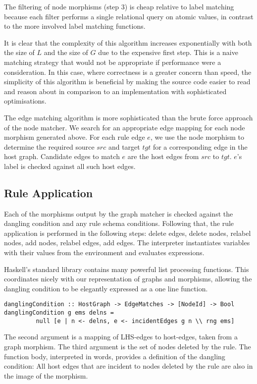 The filtering of node morphisms (step 3) is cheap relative to label matching because each filter performs a single relational query on atomic values, in contrast to the more involved label matching functions.

It is clear that the complexity of this algorithm increases exponentially with both the size of $L$ and the size of $G$ due to the expensive first step. This is a naive matching strategy that would not be appropriate if performance were a consideration. In this case, where correctness is a greater concern than speed, the simplicity of this algorithm is beneficial by making the source code easier to read and reason about in comparison to an implementation with sophisticated optimisations.

The edge matching algorithm is more sophisticated than the brute force approach of the node matcher. We search for an appropriate edge mapping for each node morphism generated above. For each rule edge $e$, we use the node morphism to determine the required source $src$ and target $tgt$ for a corresponding edge in the host graph. Candidate edges to match $e$ are the host edges from $src$ to $tgt$. $e$'s label is checked against all such host edges. 


\subsection{Rule Application}

Each of the morphisms output by the graph matcher is checked against the dangling condition and any rule schema conditions. Following that, the rule application is performed in the following steps: delete edges, delete nodes, relabel nodes, add nodes, relabel edges, add edges. The interpreter instantiates variables with their values from the environment and evaluates expressions.

Haskell's standard library contains many powerful list processing functions. This coordinates nicely with our representation of graphs and morphisms, allowing the dangling condition to be elegantly expressed as a one line function.
\begin{verbatim}
danglingCondition :: HostGraph -> EdgeMatches -> [NodeId] -> Bool
danglingCondition g ems delns = 
         null [e | n <- delns, e <- incidentEdges g n \\ rng ems]
\end{verbatim}

The second argument is a mapping of LHS-edges to host-edges, taken from a graph morphism. The third argument is the set of nodes deleted by the rule. The function body, interpreted in words, provides a definition of the dangling condition: All host edges that are incident to nodes deleted by the rule are also in the image of the morphism. 

